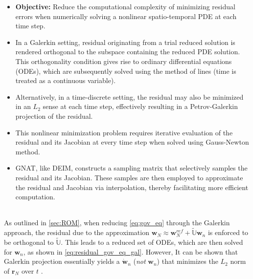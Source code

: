 \documentclass[11pt]{article}
\renewcommand{\vec}[1]{\mathbf{#1}}
\begin{document}
        \noindent\hrulefill
        \begin{itemize}
                \item {\bfseries Objective:} Reduce the computational complexity of minimizing residual errors when numerically solving a nonlinear spatio-temporal PDE at each time step.
                \item In a Galerkin setting, residual originating from a trial reduced solution is rendered orthogonal to the subspace containing the reduced PDE solution. This orthogonality condition gives rise to ordinary differential equations (ODEs), which are subsequently solved using the method of lines (time is treated as a continuous variable).
                \item Alternatively, in a time-discrete setting, the residual may also be minimized in an $L_2$ sense at each time step, effectively resulting in a Petrov-Galerkin projection of the residual.
                \item This nonlinear minimization problem requires iterative evaluation of the residual and its Jacobian at every time step when solved using Gauss-Newton method.
                \item GNAT, like DEIM, constructs a sampling matrix that selectively samples the residual and its Jacobian. These samples are then employed to approximate the residual and Jacobian via interpolation, thereby facilitating more efficient computation.
        \end{itemize}
        \noindent\hrulefill
        \\
        As outlined in \cref{sec:ROM}, when reducing \cref{eq:gov_eq} through the Galerkin approach, the residual due to the approximation $\vec{w}_N \approx \vec{w}^{ref}_N + \widetilde{\mathbb{U}}\vec{w}_n$ is enforced to be orthogonal to $\widetilde{\mathbb{U}}$.
        This leads to a reduced set of ODEs, which are then solved for $\vec{w}_n$, as shown in \cref{eq:residual_gov_eq_gal}.
        However, It can be shown that Galerkin projection essentially yields a $\dot{\vec{w}}_n$ (\textit{not} $\vec{w}_n$) that minimizes the $L_2$ norm of $\vec{r}_N$ over $t$ \cite{kim2022fasta}.
\end{document}
